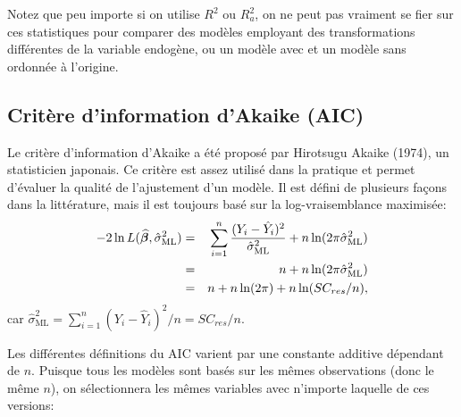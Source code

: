 Notez que peu importe si on utilise $R^2$ ou $R^2_{a}$, on ne peut pas vraiment se fier sur ces statistiques pour comparer des modèles employant des transformations différentes de la variable endogène, ou un modèle avec et un modèle sans ordonnée à l'origine.


\subsection{Critère d'information d'Akaike (AIC)}





Le critère d'information d'Akaike a été proposé par Hirotsugu Akaike (1974), un
statisticien japonais. Ce critère est assez utilisé dans la pratique et permet d'évaluer
la qualité de l'ajustement d'un modèle. Il est défini de plusieurs façons dans la littérature, mais il est toujours basé sur la log-vraisemblance maximisée:
\begin{eqnarray*}
-2\ln L(\widehat{\bm\beta},\hat\sigma^2_{\text{ML}}) & = & \sum_{i=1}^n\frac{(Y_i-\hat Y_i)^2}{\hat\sigma^2_{\text{ML}}}+n\ln(2\pi\hat\sigma^2_{\text{ML}}) \\
& = & n+n\ln(2\pi\hat\sigma^2_{\text{ML}}) \\
& = & n+n\ln(2\pi)+n\ln(SC_{res}/n),
\end{eqnarray*}
car $\hat\sigma^2_{\text{ML}}=\sum_{i=1}^n(Y_i-\hat Y_i)^2/n=SC_{res}/n.$


Les différentes définitions du AIC varient par une constante additive dépendant de $n$. Puisque tous les modèles sont basés sur les mêmes observations (donc le même $n$), on sélectionnera les mêmes variables avec n'importe laquelle de ces versions:

